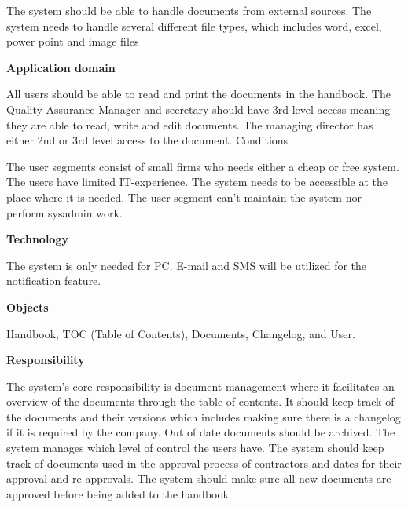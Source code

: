 The system should be able to handle documents from external sources. The system needs to handle several different file types, which includes word, excel, power point and image files

\textbf{Application domain}

All users should be able to read and print the documents in the handbook. The Quality Assurance Manager and secretary should have 3rd level access meaning they are able to read, write and edit documents. The managing director has either 2nd or 3rd level access to the document.
Conditions

The user segments consist of small firms who needs either a cheap or free system. The users have limited IT-experience. The system needs to be accessible at the place where it is needed. The user segment can’t maintain the system nor perform sysadmin work.

\textbf{Technology}

The system is only needed for PC. E-mail and SMS will be utilized for the notification feature.

\textbf{Objects}

Handbook, TOC (Table of Contents), Documents, Changelog, and User.

\textbf{Responsibility}

The system’s core responsibility is document management where it facilitates an overview of the documents through the table of contents. It should keep track of the documents and their versions which includes making sure there is a changelog if it is required by the company. Out of date documents should be archived. The system manages which level of control the users have. The system should keep track of documents used in the approval process of contractors and dates for their approval and re-approvals. The system should make sure all new documents are approved before being added to the handbook.
